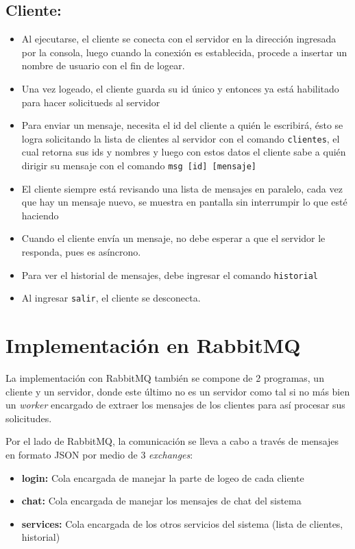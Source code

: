 \documentclass[11pt, letter]{article}
\begin{document}
\subsection{Cliente:}
\begin{itemize}
	\item Al ejecutarse, el cliente se conecta con el servidor en la dirección ingresada por la consola, luego cuando la conexión es establecida, procede a insertar un nombre de usuario con el fin de logear.
	\item Una vez logeado, el cliente guarda su id único y entonces ya está habilitado para hacer solicitueds al servidor
	\item Para enviar un mensaje, necesita el id del cliente a quién le escribirá, ésto se logra solicitando la lista de clientes al servidor con el comando \texttt{clientes}, el cual retorna sus ids y nombres y luego con estos datos el cliente sabe a quién dirigir su mensaje con el comando \texttt{msg [id] [mensaje]}
	\item El cliente siempre está revisando una lista de mensajes en paralelo, cada vez que hay un mensaje nuevo, se muestra en pantalla sin interrumpir lo que esté haciendo
	\item Cuando el cliente envía un mensaje, no debe esperar a que el servidor le responda, pues es asíncrono.
	\item Para ver el historial de mensajes, debe ingresar el comando \texttt{historial}
	\item Al ingresar \texttt{salir}, el cliente se desconecta.
\end{itemize}

\section{Implementación en RabbitMQ}

La implementación con RabbitMQ también se compone de 2 programas, un cliente y un servidor, donde este último no es un servidor como tal si no más bien un \textit{worker} encargado de extraer los mensajes de los clientes para así procesar sus solicitudes.

Por el lado de RabbitMQ, la comunicación se lleva a cabo a través de mensajes en formato JSON\cite{RFC8259} por medio de 3 \textit{exchanges}:

\begin{itemize}
	\item \textbf{login:} Cola encargada de manejar la parte de logeo de cada cliente

	\item \textbf{chat:} Cola encargada de manejar los mensajes de chat del sistema

	\item \textbf{services:} Cola encargada de los otros servicios del sistema (lista de clientes, historial)
\end{itemize}
\end{document}
